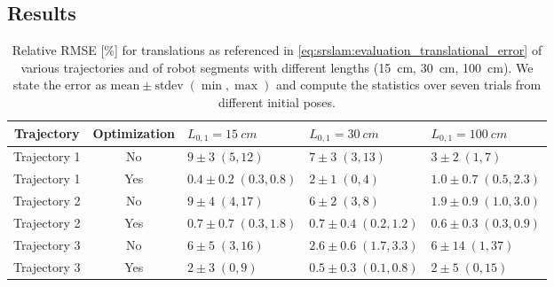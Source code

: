 \subsection{Results}\label{sub:srslam:simulation_results}
\begin{table}
\centering
\caption{Relative \gls{RMSE} [\%] for translations as referenced in \eqref{eq:srslam:evaluation_translational_error} of various trajectories and of robot segments with different lengths (\SI{15}{cm}, \SI{30}{cm}, \SI{100}{cm}). We state the error as $\text{mean} \pm \text{stdev} \; (\min, \max)$ and compute the statistics over seven trials from different initial poses.}
\begin{tabular}{cclll}\toprule
\textbf{Trajectory} & \textbf{Optimization} & $L_{0,1} = \SI{15}{cm}$ & $L_{0,1} = \SI{30}{cm}$ & $L_{0,1} = \SI{100}{cm}$\\
\midrule
Trajectory 1 & No & $9 \pm 3 \; (5, 12)$ & $7 \pm 3 \; (3, 13)$ & $3 \pm 2 \; (1, 7)$ \\
Trajectory 1 & Yes & $0.4 \pm 0.2 \; (0.3, 0.8)$ & $2 \pm 1 \; (0, 4)$ & $1.0 \pm 0.7 \; (0.5, 2.3)$ \\
\midrule
Trajectory 2 & No & $9 \pm 4 \; (4, 17)$ & $6 \pm 2 \; (3, 8)$ & $1.9 \pm 0.9 \; (1.0, 3.0)$ \\
Trajectory 2 & Yes & $0.7 \pm 0.7 \; (0.3, 1.8)$ & $0.7 \pm 0.4 \; (0.2, 1.2)$ & $0.6 \pm 0.3 \; (0.3, 0.9)$ \\
\midrule
Trajectory 3 & No & $6 \pm 5 \; (3, 16)$ & $2.6 \pm 0.6 \; (1.7, 3.3)$ & $6 \pm 14 \; (1, 37)$ \\
Trajectory 3 & Yes & $2 \pm 3 \; (0, 9)$ & $0.5 \pm 0.3 \; (0.1, 0.8)$ & $2 \pm 5 \; (0, 15)$ \\
\bottomrule
\end{tabular}
\label{tab:srslam:results_simulations_translation}
\end{table}

